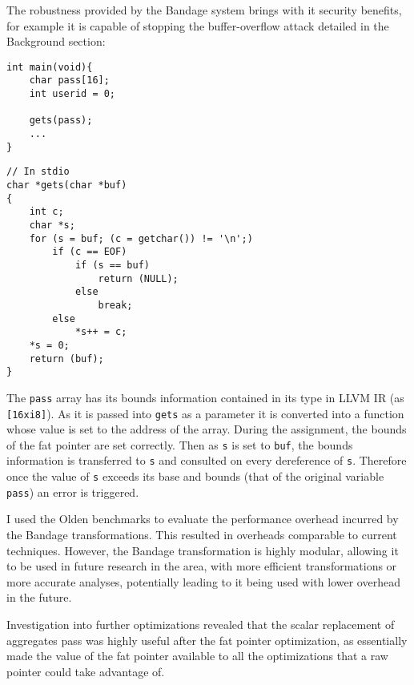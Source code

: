 


The robustness provided by the Bandage system brings with it security benefits, for example it is capable of stopping the buffer-overflow attack detailed in the Background section:

\begin{verbatim}
int main(void){
    char pass[16];
    int userid = 0;

    gets(pass);
    ...
}
\end{verbatim}

\begin{verbatim}
// In stdio
char *gets(char *buf)
{
    int c;
    char *s;
    for (s = buf; (c = getchar()) != '\n';)
        if (c == EOF)
            if (s == buf)
                return (NULL);
            else
                break;
        else
            *s++ = c;
    *s = 0;
    return (buf);
}
\end{verbatim}
The \verb!pass! array has its bounds information contained in its type in LLVM IR (as \verb![16xi8]!).
As it is passed into \verb!gets! as a parameter it is converted into a function whose value is set to the address of the array.
During the assignment, the bounds of the fat pointer are set correctly.
Then as \verb!s! is set to \verb!buf!, the bounds information is transferred to \verb!s! and consulted on every dereference of \verb!s!.
Therefore once the value of \verb!s! exceeds its base and bounds (that of the original variable \verb!pass!) an error is triggered.

I used the Olden benchmarks to evaluate the performance overhead incurred by the Bandage transformations.
This resulted in overheads comparable to current techniques.
However, the Bandage transformation is highly modular, allowing it to be used in future research in the area, with more efficient transformations or more accurate analyses, potentially leading to it being used with lower overhead in the future.

Investigation into further optimizations revealed that the scalar replacement of aggregates pass was highly useful after the fat pointer optimization, as essentially made the value of the fat pointer available to all the optimizations that a raw pointer could take advantage of.
